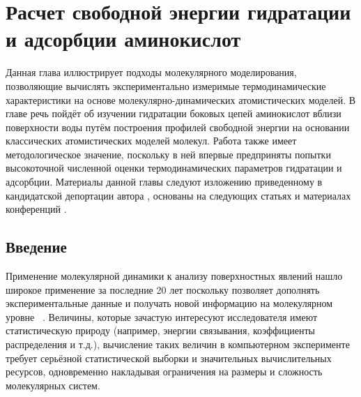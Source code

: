 \chapter{Расчет свободной энергии гидратации и адсорбции аминокислот} \label{part3_free_energy}


Данная глава иллюстрирует подходы молекулярного моделирования, позволяющие вычислять экспериментально измеримые термодинамические характеристики на основе молекулярно-динамических атомистических моделей.
В главе речь пойдёт об изучении гидратации боковых цепей аминокислот вблизи поверхности воды путём построения профилей свободной энергии на основании классических атомистических моделей молекул. Работа также имеет методологическое значение, поскольку в ней впервые предприняты попытки высокоточной численной оценки термодинамических параметров гидратации и адсорбции. Материалы данной главы следуют изложению приведенному в кандидатской депортации автора \cite{shaytan_thesis_kfmn_2010}, основаны на следующих статьях \cite{shaytan_free_2010,shaytan_solvent_2009} и материалах конференций \cite{shaytan_peptide_2006}. 

\graphicspath{{images/p3/}}

\section{Введение}
Применение молекулярной динамики к анализу поверхностных явлений нашло широкое применение за последние 20 лет поскольку позволяет дополнять экспериментальные данные и получать новой информацию на молекулярном уровне ~\cite{rev_benjamin_liq-liq_interf_1997,rev_pohorille_model_aq_sol_interf_2002}.
Величины, которые зачастую интересуют исследователя имеют статистическую природу (например, энергии связывания, коэффициенты распределения и т.д.), вычисление таких величин в компьютерном эксперименте требует серьёзной статистической выборки и значительных вычислительных ресурсов, одновременно накладывая ограничения на размеры и сложность молекулярных систем.

